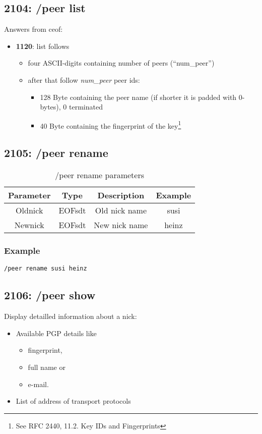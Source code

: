 \documentclass[12pt,a4paper]{book}
\begin{document}
\subsection{2104: /peer list}
Answers from ceof:
\begin{itemize}
\item \textbf{1120}: list follows
\begin{itemize}
\item four ASCII-digits containing number of peers ("`num\_peer"')
\item after that follow \textit{num\_peer} peer ids:
\begin{itemize}
\item 128 Byte containing the peer name (if shorter it is padded with 0-bytes), 0 terminated
\item 40 Byte containing the fingerprint of the
key\footnote{See RFC 2440, 11.2. Key IDs and Fingerprints}
\end{itemize}
\end{itemize}
\end{itemize}

\subsection{2105: /peer rename}
%
\begin{longtable}{|c|c|c|c|}
\caption{/peer rename parameters}\\
\hline
\textbf{Parameter} & \textbf{Type} & \textbf{Description} & \textbf{Example}\\
\hline
Oldnick & EOFsdt & Old nick name & susi\\
\hline
Newnick & EOFsdt & New nick name & heinz\\
\hline
\end{longtable}

\subsubsection{Example}
\begin{verbatim}
/peer rename susi heinz
\end{verbatim}

\subsection{2106: /peer show}
Display detailled information about a nick:
\begin{itemize}
\item Available PGP details like
\begin{itemize}
\item fingerprint,
\item full name or
\item e-mail.
\end{itemize}
\item List of address of transport protocols
\end{itemize}
\end{document}
